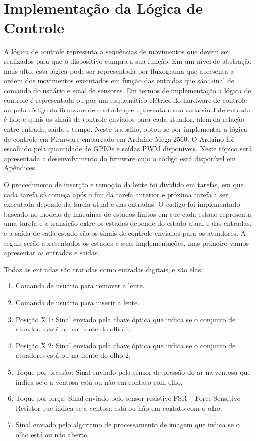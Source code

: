 \section[Implementação da Lógica de Controle]{Implementação da Lógica de Controle}

A lógica de controle representa a sequências de movimentos que devem ser realizados para que o dispositivo cumpra a sua função. Em um nível de abstração mais alto, esta lógica pode ser representada por fluxograma que apresenta a ordem dos movimentos executados em função das entradas que são: sinal de comando do usuário e sinal de sensores. Em termos de implementação a lógica de controle é representada ou por um esquemático elétrico do hardware de controle ou pelo código do firmware de controle que apresenta como cada sinal de entrada é lido e quais os sinais de controle enviados para cada atuador, além da relação entre entrada, saída e tempo. Neste trabalho, optou-se por implementar a lógica de controle em Firmware embarcado em Arduino Mega 2560. O Arduino foi escolhido pela quantidade de GPIOs e saídas PWM disponíveis. Neste tópico será apresentada o desenvolvimento do firmware cujo o código está disponível em Apêndices. 

O procedimento de inserção e remoção da lente foi dividido em tarefas, em que cada tarefa só começa após o fim da tarefa anterior e próxima tarefa a ser executada depende da tarefa atual e das entradas. O código foi implementado baseado no modelo de máquinas de estados finitos em que cada estado representa uma tarefa e a transição entre os estados depende do estado atual e das entradas, e a saída de cada estado são os sinais de controle enviados para os atuadores.  A seguir serão apresentados os estados e suas implementações, mas primeiro vamos apresentar as entradas e saídas.

Todas as entradas são tratadas como entradas digitais, e são elas:
\begin{enumerate}
\item Comando de usuário para remover a lente.
\item Comando de usuário para inserir a lente.
\item Posição X 1:  Sinal enviado pela chave óptica que indica se o conjunto de atuadores está ou na frente do olho 1;
\item Posição X 2: Sinal enviado pela chave óptica que indica se o conjunto de atuadores está ou na frente do olho 2;
\item Toque por pressão: Sinal enviado pelo sensor de pressão do ar na ventosa que indica se o a ventosa está ou não em contato com olho. 
\item Toque por força: Sinal enviado pelo sensor resistivo FSR – Force Sensitive Resistor que indica se a ventosa está ou não em contato com o olho. 
\item Sinal enviado pelo algoritmo de processamento de imagem que indica se o olho está ou não aberto.
\end{enumerate}

